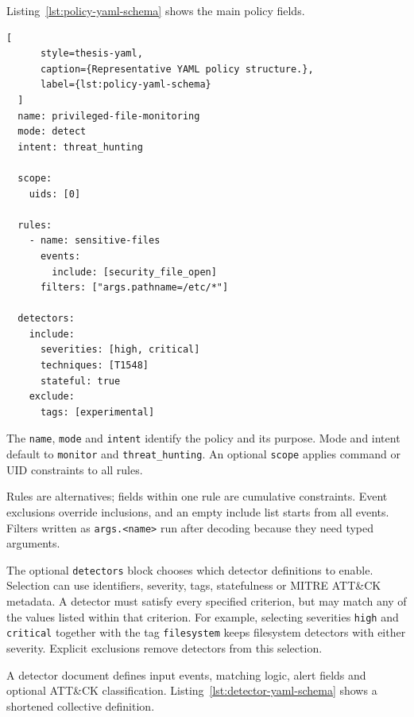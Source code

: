 Listing~\ref{lst:policy-yaml-schema} shows the main policy fields.

  \begin{lstlisting}[
      style=thesis-yaml,
      caption={Representative YAML policy structure.},
      label={lst:policy-yaml-schema}
  ]
  name: privileged-file-monitoring
  mode: detect
  intent: threat_hunting

  scope:
    uids: [0]

  rules:
    - name: sensitive-files
      events:
        include: [security_file_open]
      filters: ["args.pathname=/etc/*"]

  detectors:
    include:
      severities: [high, critical]
      techniques: [T1548]
      stateful: true
    exclude:
      tags: [experimental]
  \end{lstlisting}

The \texttt{name}, \texttt{mode} and \texttt{intent} identify the policy and its
purpose. Mode and intent default to \texttt{monitor} and
\texttt{threat\_hunting}. An optional \texttt{scope} applies command or UID
constraints to all rules.

Rules are alternatives; fields within one rule are cumulative constraints.
Event exclusions override inclusions, and an empty include list starts from all
events. Filters written as \texttt{args.<name>} run after decoding because they
need typed arguments.

The optional \texttt{detectors} block chooses which detector definitions
to enable. Selection can use identifiers, severity, tags, statefulness
or MITRE ATT\&CK metadata. A detector must satisfy every specified
criterion, but may match any of the values listed within that criterion.
For example, selecting severities \texttt{high} and \texttt{critical}
together with the tag \texttt{filesystem} keeps filesystem detectors
with either severity. Explicit exclusions remove detectors from this
selection.

A detector document defines input events, matching logic, alert fields and
optional ATT\&CK classification. Listing~\ref{lst:detector-yaml-schema} shows a
shortened collective definition.

